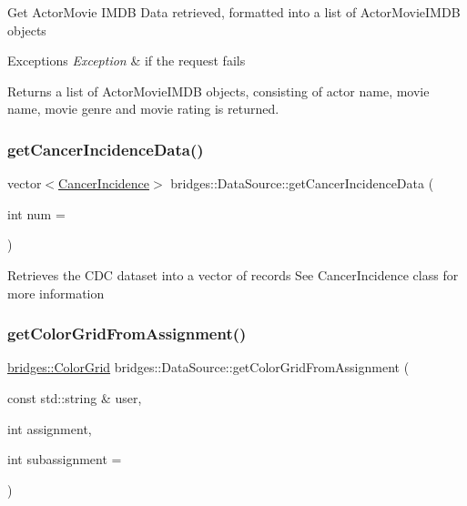 Get Actor\+Movie I\+M\+DB Data retrieved, formatted into a list of Actor\+Movie\+I\+M\+DB objects


\begin{DoxyExceptions}{Exceptions}
{\em Exception} & if the request fails\\
\hline
\end{DoxyExceptions}
\begin{DoxyReturn}{Returns}
a list of Actor\+Movie\+I\+M\+DB objects, consisting of actor name, movie name, movie genre and movie rating is returned. 
\end{DoxyReturn}
\mbox{\label{classbridges_1_1_data_source_a52d8161e7c093ab3615acea7085f6689}} 
\subsubsection{\texorpdfstring{getCancerIncidenceData()}{getCancerIncidenceData()}}
{\footnotesize\ttfamily vector$<$\mbox{\hyperlink{classbridges_1_1dataset_1_1_cancer_incidence}{Cancer\+Incidence}}$>$ bridges\+::\+Data\+Source\+::get\+Cancer\+Incidence\+Data (\begin{DoxyParamCaption}\item[{int}]{num = {} }\end{DoxyParamCaption})\hspace{0.3cm}{\ttfamily [inline]}}

Retrieves the C\+DC dataset into a vector of records See Cancer\+Incidence class for more information \mbox{\label{classbridges_1_1_data_source_aa65136879011e1ec237380ef8587fea2}} 
\subsubsection{\texorpdfstring{getColorGridFromAssignment()}{getColorGridFromAssignment()}}
{\footnotesize\ttfamily \mbox{\hyperlink{classbridges_1_1datastructure_1_1_color_grid}{bridges\+::\+Color\+Grid}} bridges\+::\+Data\+Source\+::get\+Color\+Grid\+From\+Assignment (\begin{DoxyParamCaption}\item[{const std\+::string \&}]{user,  }\item[{int}]{assignment,  }\item[{int}]{subassignment = {} }\end{DoxyParamCaption})\hspace{0.3cm}{\ttfamily [inline]}}

